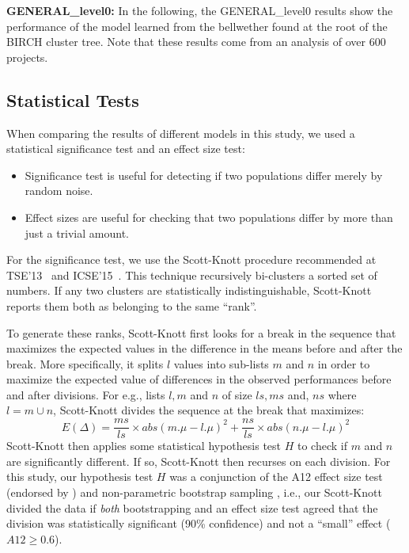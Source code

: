 \documentclass[10pt,journal,compsoc]{IEEEtran}
\newcommand{\bi}{\begin{itemize}}
\newcommand{\ei}{\end{itemize}}
\begin{document}
\textbf{GENERAL\_level0:}  
In the following,  the  GENERAL\_level0 results show the performance of the model learned from the bellwether found at the root of the BIRCH cluster tree. Note that these results come from an analysis of over 600 projects. 

 
\subsection{Statistical Tests}
\label{eval}

When comparing the results of different models in this study, we used a statistical significance test and an effect size test:
\bi
\item
Significance test is useful for detecting if two populations
differ merely by random noise. 
\item
Effect sizes are useful for checking that two populations differ by more than just a trivial amount.
\ei
For the significance test,  we use the Scott-Knott procedure  recommended at TSE'13~\cite{mittas2013ranking} and ICSE'15~\cite{ghotra2015revisiting}. This technique recursively bi-clusters a sorted set of numbers. If any two clusters are statistically indistinguishable, Scott-Knott reports them both as belonging to the same ``rank''.

To generate these ranks, Scott-Knott first looks for a break in the sequence that maximizes the expected values in the difference in the means before and after the break. More specifically,  it  splits $l$ values into sub-lists $m$ and $n$ in order to maximize the expected value of differences  in the observed performances before and after divisions. For e.g., lists $l,m$ and $n$ of size $ls,ms$ and, $ns$ where $l=m\cup n$, Scott-Knott divides the sequence at the break that maximizes:
\begin{equation}
    E(\Delta)=\frac{ms}{ls}\times abs(m.\mu - l.\mu)^2  + \frac{ns}{ls}\times abs(n.\mu - l.\mu)^2
\end{equation}
Scott-Knott then applies some statistical hypothesis test $H$ to check if $m$ and $n$ are significantly different. If so, Scott-Knott then recurses on each division. For this study, our hypothesis test $H$ was a conjunction of the A12 effect size test (endorsed by \cite{arcuri2011practical})  and non-parametric bootstrap sampling \cite{efron94}, i.e., our Scott-Knott divided the data if {\em both} bootstrapping and an effect size test agreed that the division was statistically significant (90\% confidence) and not a ``small'' effect ($A12 \ge 0.6$).
\end{document}
